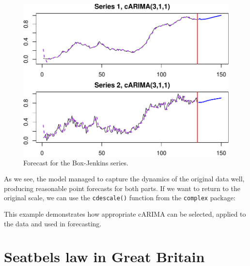 \documentclass[
]{book}
\newenvironment{Shaded}{\begin{snugshade}}{\end{snugshade}}
\newcommand{\AttributeTok}[1]{\textcolor[rgb]{0.77,0.63,0.00}{#1}}
\newcommand{\ConstantTok}[1]{\textcolor[rgb]{0.00,0.00,0.00}{#1}}
\newcommand{\DecValTok}[1]{\textcolor[rgb]{0.00,0.00,0.81}{#1}}
\newcommand{\FunctionTok}[1]{\textcolor[rgb]{0.00,0.00,0.00}{#1}}
\newcommand{\NormalTok}[1]{#1}
\newcommand{\OtherTok}[1]{\textcolor[rgb]{0.56,0.35,0.01}{#1}}
\newcommand{\SpecialCharTok}[1]{\textcolor[rgb]{0.00,0.00,0.00}{#1}}
\newcommand{\StringTok}[1]{\textcolor[rgb]{0.31,0.60,0.02}{#1}}
\begin{document}
\begin{figure}
\centering
\includegraphics{Svetunkov---Svetunkov---Complex-Valued-Econometrics_files/figure-latex/BJSalesComplexForecast-1.pdf}
\caption{\label{fig:BJSalesComplexForecast}Forecast for the Box-Jenkins series.}
\end{figure}

As we see, the model managed to capture the dynamics of the original data well, producing reasonable point forecasts for both parts. If we want to return to the original scale, we can use the \texttt{cdescale()} function from the \texttt{complex} package:

\begin{Shaded}
\end{Shaded}

This example demonstrates how appropriate cARIMA can be selected, applied to the data and used in forecasting.

\hypertarget{seatbeltsExample}{%
\section{Seatbels law in Great Britain}\label{seatbeltsExample}}
\end{document}
